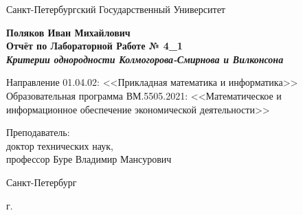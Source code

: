 \begin{titlepage}
	\begin{center}		
		Санкт-Петербургский Государственный Университет

		\vspace{35mm}
		
		\textbf{\large Поляков Иван Михайлович} \\[8mm]
		
		\textbf{\large Отчёт по Лабораторной Работе № 4\_1}\\[3mm]
		\textbf{\textit{\large Критерии однородности Колмогорова-Смирнова и Вилконсона}}
		
		\vspace{20mm}
		
		Направление 01.04.02: <<Прикладная математика и информатика>>\\ 
		Образовательная программа ВМ.5505.2021: <<Математическое и информационное обеспечение экономической деятельности>> \\ [30mm]
		
		
		\begin{flushright}
			{Преподаватель:} \\
			доктор технических наук, \\ профессор Буре Владимир Мансурович
		\end{flushright}
		
		\vfill
		
		{Санкт-Петербург}
		\par{\the\year{} г.}
	\end{center}
\end{titlepage}
\restoregeometry
\addtocounter{page}{1}

